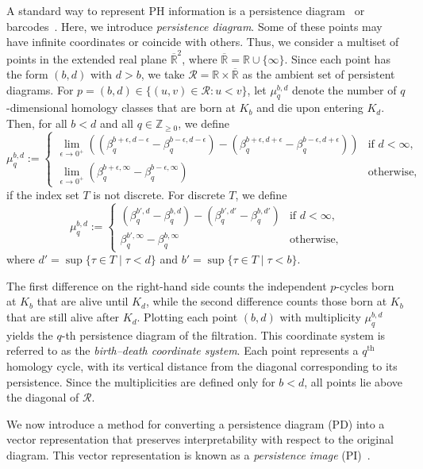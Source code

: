 \documentclass{article}
\newcommand{\R}{\mathbb{R}}
\newcommand{\Z}{\mathbb{Z}}
\begin{document}
A standard way to represent PH information is a persistence diagram~\cite{ELZ02} or barcodes~\cite{Ghrist07}. Here, we introduce \emph{persistence diagram}. Some of these points may have infinite coordinates or coincide with others. Thus, we consider a multiset of points in the extended real plane $\overline{\R}^2$, where $\overline{\R} = \R \cup \{\infty\}$. Since each point has the form $(b,d)$ with $d>b$, we take $\mathcal{R} = \R \times \overline{\R}$ as the ambient set of persistent diagrams. For $p = (b,d) \in \{(u,v) \in \mathcal{R} : u < v\}$, let $\mu_{q}^{b,d}$ denote the number of $q$-dimensional homology classes that are born at $K_b$ and die upon entering $K_d$. Then, for all $b < d$ and all $q \in \Z_{\geq 0}$, we define
\[
\mu_{q}^{b,d} := \begin{cases}
    \lim_{\epsilon \to 0^+} \left( \left(\beta_q^{b +\epsilon, d - \epsilon} - \beta_q^{b - \epsilon, d - \epsilon}\right) - \left( \beta_q^{b +\epsilon, d + \epsilon} - \beta_q^{b -\epsilon, d + \epsilon} \right) \right)& \textrm{if } d < \infty, \\
    \lim_{\epsilon \to 0^+} \left(\beta_q^{b +\epsilon, \infty} - \beta_q^{b - \epsilon, \infty}\right)& \textrm{otherwise},
\end{cases} 
\] if the index set $T$ is not discrete. For discrete $T$, we define \[\mu_{q}^{b,d} := \begin{cases}
\left(\beta_q^{b',d} - \beta_q^{b,d}\right) - \left(\beta_q^{b',d'} - \beta_q^{b,d'}\right)& \textrm{if } d < \infty,\\
\beta_q^{b',\infty} - \beta_q^{b,\infty}& \textrm{otherwise,}
\end{cases}\]
where $d' = \sup\{\tau \in T \mid \tau < d\}$ and $b' = \sup\{\tau \in T \mid \tau < b\}$. 

The first difference on the right-hand side counts the independent $p$-cycles born at $K_b$ that are alive until $K_d$, while the second difference counts those born at $K_b$ that are still alive after $K_d$. Plotting each point $(b,d)$ with multiplicity $\mu_q^{b,d}$ yields the $q$-th persistence diagram of the filtration. This coordinate system is referred to as the \emph{birth--death coordinate system}. Each point represents a $q^{\textrm{th}}$ homology cycle, with its vertical distance from the diagonal corresponding to its persistence. Since the multiplicities are defined only for $b < d$, all points lie above the diagonal of $\mathcal{R}$. 

We now introduce a method for converting a persistence diagram (PD) into a vector representation that preserves interpretability with respect to the original diagram. This vector representation is known as a \emph{persistence image} (PI)~\cite{PI17}.
\end{document}
